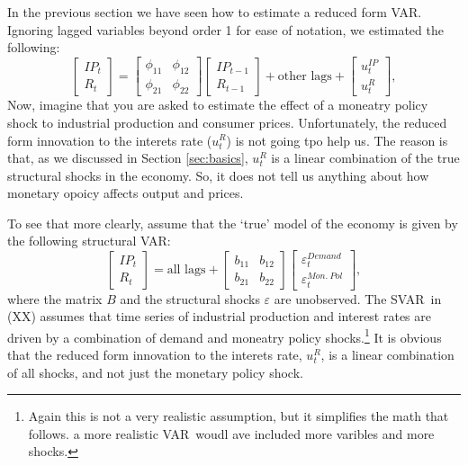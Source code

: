 \documentclass[10pt]{article}
\begin{document}
In the previous section we have seen how to estimate a reduced form VAR.
Ignoring lagged variables beyond order 1 for ease of notation, we estimated
the following:%
\begin{equation}
\begin{bmatrix}
IP_{t} \\ 
R_{t}%
\end{bmatrix}%
=\left[ 
\begin{array}{cc}
\phi _{11} & \phi _{12} \\ 
\phi _{21} & \phi _{22}%
\end{array}%
\right] 
\begin{bmatrix}
IP_{t-1} \\ 
R_{t-1}%
\end{bmatrix}%
+\text{other lags}+%
\begin{bmatrix}
u_{t}^{IP} \\ 
u_{t}^{R}%
\end{bmatrix}%
,  \label{eq:red_2var}
\end{equation}%
Now, imagine that you are asked to estimate the effect of a moneatry policy
shock to industrial production and consumer prices. Unfortunately, the
reduced form innovation to the interets rate ($u_{t}^{R}$) is not going tpo
help us. The reason is that, as we discussed in Section \ref{sec:basics}, $%
u_{t}^{R}$ is a linear combination of the true structural shocks in the
economy. So, it does not tell us anything about how monetary opoicy affects
output and prices. 

To see that more clearly, assume that the `true' model of the economy is
given by the following structural VAR:%
\begin{equation}
\begin{bmatrix}
IP_{t} \\ 
R_{t}%
\end{bmatrix}%
=\text{all lags}+\left[ 
\begin{array}{cc}
b_{11} & b_{12} \\ 
b_{21} & b_{22}%
\end{array}%
\right] 
\begin{bmatrix}
\varepsilon _{t}^{Demand} \\ 
\varepsilon _{t}^{Mon.\ Pol}%
\end{bmatrix}%
,  \label{eq:struct_2var}
\end{equation}%
where the matrix $B$ and the structural shocks $\varepsilon $ are
unobserved. The SVAR\ in (XX) assumes that time series of industrial
production and interest rates are driven by a combination of demand and
moneatry policy shocks.\footnote{%
Again this is not a very realistic assumption, but it simplifies the math
that follows. a more realistic VAR\ woudl ave included more varibles and
more shocks.} It is obvious that the reduced form innovation to the interets
rate, $u_{t}^{R}$, is a linear combination of all shocks, and not just the
monetary policy shock.
\end{document}
